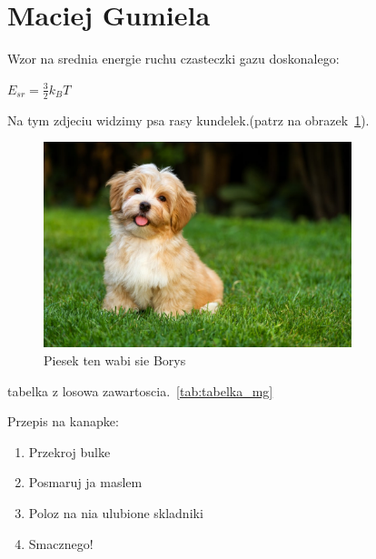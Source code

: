 \section{Maciej Gumiela}
\label{sec:mgumiela}
Wzor na srednia energie ruchu czasteczki gazu doskonalego: 
\begin{center}
\begin{Large}
    $E_{sr} =  \frac{3}{2}k_B T$
\end{Large}
\end{center}

Na tym zdjeciu widzimy psa rasy kundelek.(patrz na obrazek~\ref{fig:pies}).
\begin{figure}
    \centering
    \includegraphics[width=0.8\textwidth]{pictures/pies.jpg}
    \caption{Piesek ten wabi sie Borys}
    \label{fig:pies}
\end{figure}
\newpage
tabelka z losowa zawartoscia.~\ref{tab:tabelka_mg} 


\label{tab:tabelka_mg}
\vspace{0,7cm} %

\noindent Przepis na kanapke:
\begin{enumerate}
    \item Przekroj bulke
    \item Posmaruj ja maslem
    \item Poloz na nia ulubione skladniki
    \item Smacznego!
\end{enumerate} 

